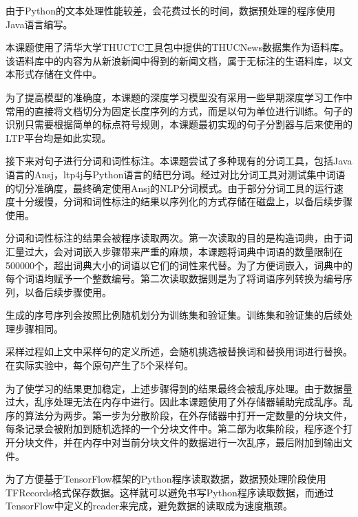由于Python的文本处理性能较差，会花费过长的时间，数据预处理的程序使用Java语言编写。

本课题使用了清华大学THUCTC工具包中提供的THUCNews数据集作为语料库。该语料库中的内容为从新浪新闻中得到的新闻文档，属于无标注的生语料库，以文本形式存储在文件中。

为了提高模型的准确度，本课题的深度学习模型没有采用一些早期深度学习工作中常用的直接将文档切分为固定长度序列的方式，而是以句为单位进行训练。句子的识别只需要根据简单的标点符号规则，本课题最初实现的句子分割器与后来使用的LTP平台均是如此实现。

接下来对句子进行分词和词性标注。本课题尝试了多种现有的分词工具，包括Java语言的Ansj，ltp4j与Python语言的结巴分词。经过对比分词工具对测试集中词语的切分准确度，最终确定使用Ansj的NLP分词模式。由于部分分词工具的运行速度十分缓慢，分词和词性标注的结果以序列化的方式存储在磁盘上，以备后续步骤使用。

分词和词性标注的结果会被程序读取两次。第一次读取的目的是构造词典，由于词汇量过大，会对词嵌入步骤带来严重的麻烦，本课题将词典中词语的数量限制在500000个，超出词典大小的词语以它们的词性来代替。为了方便词嵌入，词典中的每个词语均赋予一个整数编号。第二次读取数据则是为了将词语序列转换为编号序列，以备后续步骤使用。

生成的序号序列会按照比例随机划分为训练集和验证集。训练集和验证集的后续处理步骤相同。

采样过程如上文中采样句的定义所述，会随机挑选被替换词和替换用词进行替换。在实际实验中，每个原句产生了5个采样句。

为了使学习的结果更加稳定，上述步骤得到的结果最终会被乱序处理。由于数据量过大，乱序处理无法在内存中进行。因此本课题使用了外存储器辅助完成乱序。乱序的算法分为两步。第一步为分散阶段，在外存储器中打开一定数量的分块文件，每条记录会被附加到随机选择的一个分块文件中。第二部为收集阶段，程序逐个打开分块文件，并在内存中对当前分块文件的数据进行一次乱序，最后附加到输出文件。

为了方便基于TensorFlow框架的Python程序读取数据，数据预处理阶段使用TFRecords格式保存数据。这样就可以避免书写Python程序读取数据，而通过TensorFlow中定义的reader来完成，避免数据的读取成为速度瓶颈。